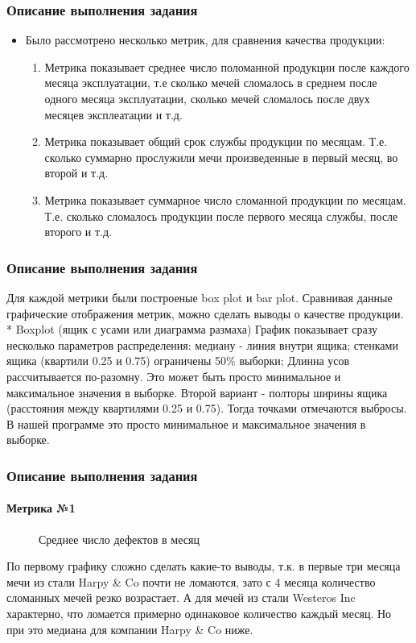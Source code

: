 \documentclass{beamer}
\begin{document}
	\begin{frame}
		\frametitle{Описание выполнения задания}
		\begin{itemize}
			\item<1-> Было рассмотрено несколько метрик, для сравнения качества продукции: 
			\begin{enumerate}
				\item Метрика показывает среднее число поломанной продукции после каждого месяца эксплуатации, т.е сколько мечей сломалось в среднем после одного месяца эксплуатации, сколько мечей сломалось после двух месяцев эксплеатации и т.д.
				\item Метрика показывает общий срок службы продукции по месяцам. Т.е. сколько суммарно прослужили мечи произведенные в первый месяц, во второй и т.д.
				\item Метрика показывает суммарное число сломанной продукции по месяцам. Т.е. сколько сломалось продукции после первого месяца службы, после второго и т.д.
			\end{enumerate}
		\end{itemize}
	\end{frame}
	\begin{frame}
		\frametitle{Описание выполнения задания}
		Для каждой метрики были построеные box plot и bar plot. Сравнивая данные графические отображения метрик, можно сделать выводы о качестве продукции.
		\\*
		Boxplot (ящик с усами или диаграмма размаха)
		График показывает сразу несколько параметров распределения:
		медиану - линия внутри ящика;
		стенками ящика (квартили 0.25 и 0.75) ограничены 50\% выборки;
		Длинна усов рассчитывается по-разомну.
		Это может быть просто минимальное и максимальное значения в выборке. Второй вариант - полторы ширины ящика (расстояния между квартилями 0.25 и 0.75). Тогда точками отмечаются выбросы. В нашей программе это просто минимальное и максимальное значения в выборке. 
	\end{frame}
	\begin{frame}[shrink=4]
		\frametitle{Описание выполнения задания}
		\framesubtitle{Метрика №1}
		\begin{figure}[h!]
			\begin{minipage}[h]{0.49\linewidth}
			\end{minipage}
			\hfill
			\begin{minipage}[h]{0.49\linewidth}
			\end{minipage}
			\caption{Среднее число дефектов в месяц}
			\label{ris:1}
		\end{figure}
		По первому графику сложно сделать какие-то выводы, т.к. в первые три месяца мечи из стали Harpy \& Co почти не ломаются, зато с 4 месяца количество сломанных мечей резко возрастает. А для мечей из стали Westeros Inc характерно, что ломается примерно одинаковое количество каждый месяц. Но при это медиана для компании Harpy \& Co ниже.
	\end{frame}
\end{document}
